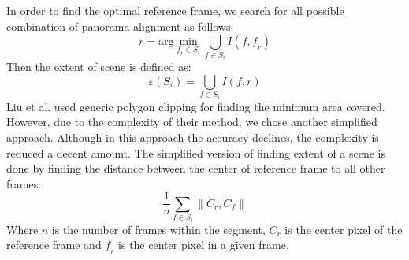 \documentclass[12pt]{article}
\begin{document}
In order to find the optimal reference frame, we search for all possible combination of panorama alignment as follows:
\begin{equation}
\mathit{r} = \mathrm{arg} \min_{\mathit{f_r} \in \mathit{S_i}} \bigcup_{\mathit{f} \in \mathit{S_i}} \mathit{I(f, f_r)}
\end{equation}
Then the extent of scene is defined as:
\begin{equation}
\varepsilon(\mathit{S_i}) = \bigcup_{\mathit{f} \in \mathit{S_i}} \mathit{I(f, r)}
\end{equation}
Liu et al. \cite{Liu} used generic polygon clipping for finding the minimum area covered. However, due to the complexity of their method, we chose another simplified approach. Although in this approach the accuracy declines, the complexity is reduced a decent amount. The simplified version of finding extent of a scene is done by finding the distance between the center of reference frame to all other frames:
\begin{equation}
\frac{1}{\mathit{n}} \sum_{\mathit{f \in S_i}}  \lVert \mathit{C_r}, \mathit{C_f} \rVert
\end{equation}
Where $\mathit{n}$ is the number of frames within the segment, $\mathit{C_r}$ is the center pixel of the reference frame and $\mathit{f_r}$ is the center pixel in a given frame.
\end{document}

